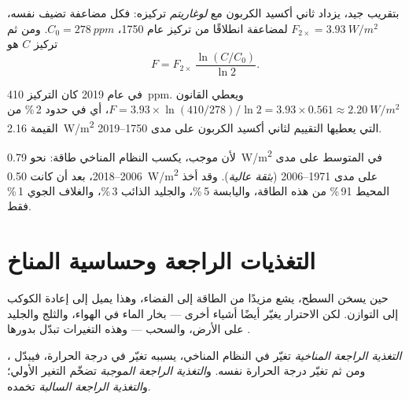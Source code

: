 \begin{proposition}\label{prop:g12:climate-change:log}
بتقريب جيد، يزداد  ثاني أكسيد الكربون مع
\emph{لوغاريتم} تركيزه: فكل مضاعفة تضيف  نفسه،
$F_{2\times} = \qty{3.93}{W/m^2}$ لمضاعفة انطلاقًا من تركيز
عام 1750، $C_0 = \qty{278}{ppm}$. ومن ثم  تركيز $C$ هو
\[
  F = F_{2\times}\,\frac{\ln (C/C_0)}{\ln 2}.
\]
\end{proposition}

\begin{example}\label{ex:g12:climate-change:check}
في عام 2019 كان التركيز \qty{410}{ppm}. ويعطي القانون
$F = 3.93 \times \ln(410/278)/\ln 2 = 3.93 \times 0.561 \approx
\qty{2.20}{W/m^2}$، أي في حدود 2\,\% من القيمة \qty{2.16}{W/m^2} التي
يعطيها التقييم لثاني أكسيد الكربون على مدى 1750--2019.
\end{example}

\begin{proposition}\label{prop:g12:climate-change:heating}
لأن  موجب، يكسب النظام المناخي طاقة: نحو
\qty{0.79}{W/m^2} في المتوسط على مدى 2006--2018، بعد أن كانت \qty{0.50}{W/m^2} على مدى
1971--2006 (\emph{بثقة عالية}). وقد أخذ المحيط 91\,\% من هذه الطاقة،
واليابسة 5\,\%، والجليد الذائب 3\,\%، والغلاف الجوي 1\,\% فقط.
\end{proposition}

\section{التغذيات الراجعة وحساسية المناخ}

حين يسخن السطح، يشع مزيدًا من الطاقة إلى الفضاء، وهذا يميل إلى
إعادة الكوكب إلى التوازن. لكن الاحترار يغيّر أيضًا أشياء
أخرى --- بخار الماء في الهواء، والثلج والجليد على الأرض،
والسحب --- وهذه التغيرات تبدّل بدورها .

\begin{definition}\label{def:g12:climate-change:feedback}
\emph{التغذية الراجعة المناخية} تغيّر في النظام
المناخي، يسببه تغيّر في درجة الحرارة، فيبدّل ،
ومن ثم تغيّر درجة الحرارة نفسه. و\emph{التغذية الراجعة الموجبة} تضخّم
التغير الأولي؛ و\emph{التغذية الراجعة السالبة} تخمده.
\end{definition}

